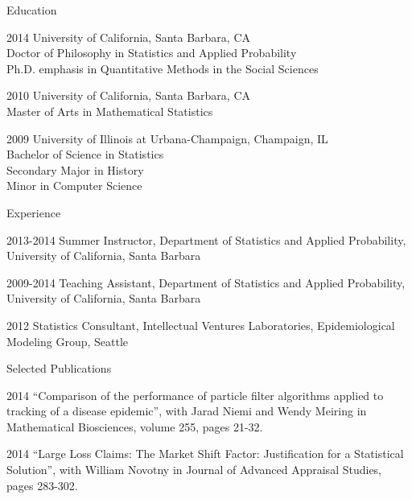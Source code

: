   \begin{vitae}

    {\small
      \begin{vitaesection}{Education}
        \vspace{-0.1cm}
      \item [2014] University of California, Santa Barbara, CA \\
      Doctor of Philosophy in Statistics and Applied Probability \\
      Ph.D. emphasis in Quantitative Methods in the Social Sciences
      \item [2010] University of California, Santa Barbara, CA \\
      Master of Arts in Mathematical Statistics
      \item [2009] University of Illinois at Urbana-Champaign, Champaign, IL \\
      Bachelor of Science in Statistics \\
      Secondary Major in History \\
      Minor in Computer Science
      \end{vitaesection}

      \begin{vitaesection}{Experience}
        \vspace{-0.1cm}
      \item [2013-2014] Summer Instructor, Department of Statistics and Applied Probability, University of California, Santa Barbara
      \item [2009-2014] Teaching Assistant, Department of Statistics and Applied Probability, University of California, Santa Barbara
      \item [2012] Statistics Consultant, Intellectual Ventures Laboratories, Epidemiological Modeling Group, Seattle
      \end{vitaesection}

      \begin{vitaesection}{Selected Publications}
        \vspace{-0.1cm}
      \item [2014] ``Comparison of the performance of particle filter algorithms applied to tracking of a disease epidemic'', with Jarad Niemi and Wendy Meiring in Mathematical Biosciences, volume 255, pages 21-32.
      \item [2014] ``Large Loss Claims: The Market Shift Factor: Justification for a Statistical Solution'', with William Novotny in Journal of Advanced Appraisal Studies, pages 283-302.
        \vspace{0.3cm}
      \end{vitaesection}

}
\end{vitae}
